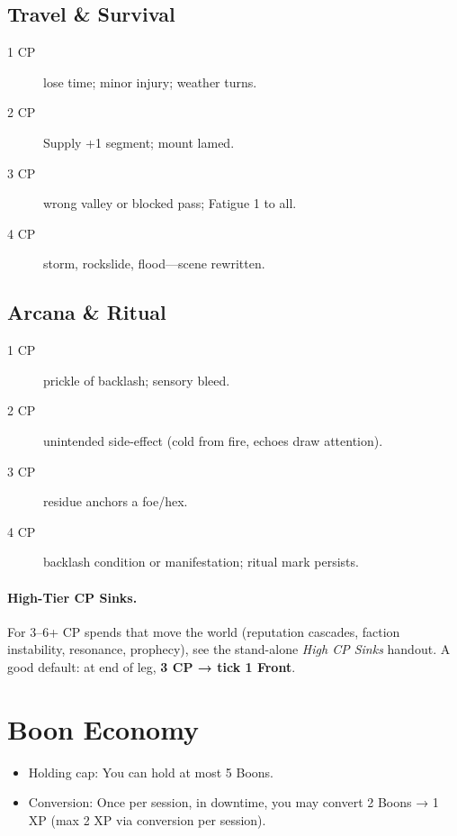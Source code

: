\subsection{Travel \& Survival}

\begin{description}
\item[1 CP] lose time; minor injury; weather turns.
\item[2 CP] Supply +1 segment; mount lamed.
\item[3 CP] wrong valley or blocked pass; Fatigue 1 to all.
\item[4 CP] storm, rockslide, flood---scene rewritten.
\end{description}

\subsection{Arcana \& Ritual}

\begin{description}
\item[1 CP] prickle of backlash; sensory bleed.
\item[2 CP] unintended side-effect (cold from fire, echoes draw attention).
\item[3 CP] residue anchors a foe/hex.
\item[4 CP] backlash condition or manifestation; ritual mark persists.
\end{description}

\paragraph{High-Tier CP Sinks.}
For 3–6+ CP spends that move the world (reputation cascades, faction instability, resonance, prophecy), see the stand-alone \emph{High CP Sinks} handout. A good default: at end of leg, \textbf{3 CP → tick 1 Front}.

\section{Boon Economy}

\begin{itemize}
    \item Holding cap: You can hold at most 5 Boons.
    \item Conversion: Once per session, in downtime, you may convert 2 Boons → 1 XP (max 2 XP via conversion per session).
\end{itemize}

